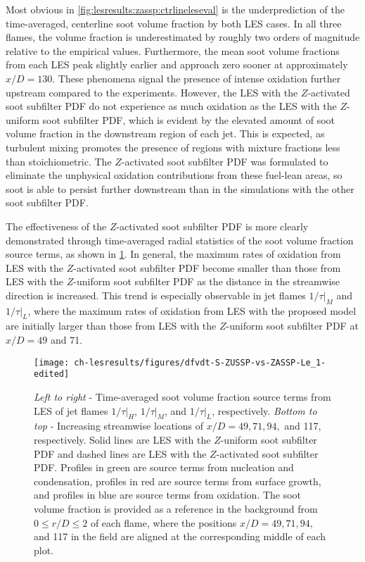 Most obvious in \cref{fig:lesresults:zassp:ctrlineleseval} is the underprediction of the time-averaged, centerline soot volume fraction by both LES cases. In all three flames, the volume fraction is underestimated by roughly two orders of magnitude relative to the empirical values. Furthermore, the mean soot volume fractions from each LES peak slightly earlier and approach zero sooner at approximately $x/D = 130$. These phenomena signal the presence of intense oxidation further upstream compared to the experiments. However, the LES with the $Z$-activated soot subfilter PDF do not experience as much oxidation as the LES with the $Z$-uniform soot subfilter PDF, which is evident by the elevated amount of soot volume fraction in the downstream region of each jet. This is expected, as turbulent mixing promotes the presence of regions with mixture fractions less than stoichiometric. The $Z$-activated soot subfilter PDF was formulated to eliminate the unphysical oxidation contributions from these fuel-lean areas, so soot is able to persist further downstream than in the simulations with the other soot subfilter PDF.

The effectiveness of the $Z$-activated soot subfilter PDF is more clearly demonstrated through time-averaged radial statistics of the soot volume fraction source terms, as shown in \cref{fig:lesresults:zassp:radialdfvdt}. In general, the maximum rates of oxidation from LES with the $Z$-activated soot subfilter PDF become smaller than those from LES with the $Z$-uniform soot subfilter PDF as the distance in the streamwise direction is increased. This trend is especially observable in jet flames $1/\tau|_M$ and $1/\tau|_L$, where the maximum rates of oxidation from LES with the proposed model are initially larger than those from LES with the $Z$-uniform soot subfilter PDF at $x/D = 49$ and 71.

\begin{figure}[htb]
  \centering
  \texttt{[image: ch-lesresults/figures/dfvdt-S-ZUSSP-vs-ZASSP-Le\_1-edited]}
  \caption[Radial \texorpdfstring{$\langle df_V/dt \rangle$}{<dfV/dt>} from LES with \texorpdfstring{$Z$}{Z}-Activated Soot Subfilter PDF]{\textit{Left to right} - Time-averaged soot volume fraction source terms from LES of jet flames $1/\tau|_H$, $1/\tau|_M$, and $1/\tau|_L$, respectively. \textit{Bottom to top} - Increasing streamwise locations of $x/D = 49, 71, 94,$ and 117, respectively. Solid lines are LES with the $Z$-uniform soot subfilter PDF and dashed lines are LES with the $Z$-activated soot subfilter PDF. Profiles in green are source terms from nucleation and condensation, profiles in red are source terms from surface growth, and profiles in blue are source terms from oxidation. The soot volume fraction is provided as a reference in the background from $0 \le r/D \le 2$ of each flame, where the positions $x/D = 49, 71, 94,$ and 117 in the field are aligned at the corresponding middle of each plot.}
  \label{fig:lesresults:zassp:radialdfvdt}
\end{figure}

